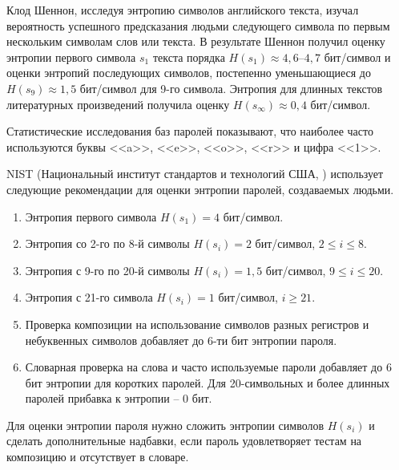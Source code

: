 Клод Шеннон, исследуя энтропию символов английского текста, изучал вероятность успешного предсказания людьми следующего символа по первым нескольким символам слов или текста. В результате Шеннон получил оценку энтропии первого символа $s_1$ текста порядка $H(s_1) \approx 4{,}6$--$4{,}7$ бит/символ и оценки энтропий последующих символов, постепенно уменьшающиеся до $H(s_9) \approx 1{,}5$ бит/символ для 9-го символа. Энтропия для длинных текстов литературных произведений получила оценку $H(s_\infty) \approx 0{,}4$ бит/символ.

Статистические исследования баз паролей показывают, что наиболее часто используются буквы <<a>>, <<e>>, <<o>>, <<r>> и цифра <<1>>.

NIST (Национальный институт стандартов и технологий США, )  использует следующие рекомендации для оценки энтропии паролей, создаваемых людьми.
\begin{enumerate}
    \item Энтропия первого символа $H(s_1) = 4$ бит/символ.
    \item Энтропия со 2-го по 8-й символы $H(s_{i}) = 2$ бит/символ, $2 \leq i \leq 8$.
    \item Энтропия с 9-го по 20-й символы $H(s_{i}) = 1{,}5$ бит/символ, $9 \leq i \leq 20$.
    \item Энтропия с 21-го символа $H(s_{i}) = 1$ бит/символ, $i \geq 21$.
    \item Проверка композиции на использование символов разных регистров и небуквенных символов добавляет до 6-ти бит энтропии пароля.
    \item Словарная проверка на слова и часто используемые пароли добавляет до 6 бит энтропии для коротких паролей. Для 20-символьных и более длинных паролей прибавка к энтропии -- 0 бит.
\end{enumerate}

Для оценки энтропии пароля нужно сложить энтропии символов $H(s_i)$ и сделать дополнительные надбавки, если пароль удовлетворяет тестам на композицию и отсутствует в словаре.

